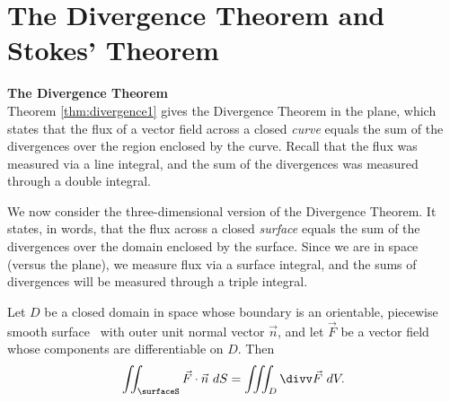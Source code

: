 \section{The Divergence Theorem and Stokes' Theorem}\label{sec:stokes_divergence}

\noindent\textbf{\large The Divergence Theorem}\\

Theorem \ref{thm:divergence1} gives the Divergence Theorem in the plane, which states that the flux of a vector field across a closed \emph{curve} equals the sum of the divergences over the region enclosed by the curve. Recall that the flux was measured via a line integral, and the sum of the divergences was measured through a double integral.

We now consider the three-dimensional version of the Divergence Theorem. It states, in words, that the flux across a closed \emph{surface} equals the sum of the divergences over the domain enclosed by the surface. Since we are in space (versus the plane), we measure flux via a surface integral, and the sums of divergences will be measured through a triple integral.

{Let $D$ be a closed domain in space whose boundary is an orientable, piecewise smooth surface \surfaceS\ with outer unit normal vector $\vec n$, and let $\vec F$ be a vector field whose components are differentiable on $D$. Then
\[
\iint_\surfaceS \vec F\cdot\vec n\ dS =\iiint_D \divv \vec F\ dV.
\] 
}

